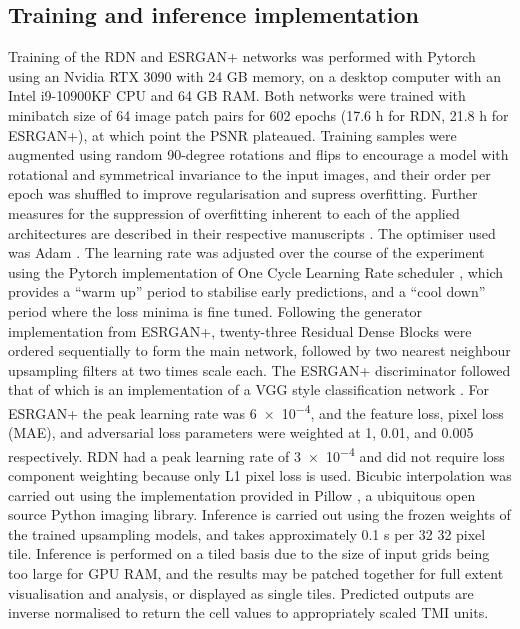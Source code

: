 \documentclass[manuscript.tex]{subfiles}
\begin{document}
\subsection{Training and inference implementation}
Training of the RDN\textdaggerdbl{} and ESRGAN+ networks was performed with Pytorch \parencite{paszkePyTorchImperativeStyle2019} using an Nvidia RTX 3090 with 24 GB memory, on a desktop computer with an Intel i9-10900KF CPU and 64 GB RAM\@.
Both networks were trained with minibatch size of 64 image patch pairs for \num{602} epochs (\num{17.6} h for RDN\textdaggerdbl{}, \num{21.8} h for ESRGAN+), at which point the PSNR plateaued.
Training samples were augmented using random 90-degree rotations and flips to encourage a model with rotational and symmetrical invariance to the input images, and their order per epoch was shuffled to improve regularisation and supress overfitting.
Further measures for the suppression of overfitting inherent to each of the applied architectures are described in their respective manuscripts \parencite{wangESRGANEnhancedSuperresolution2018,zhangResidualDenseNetwork2018}.
The optimiser used was Adam \parencite{kingmaAdamMethodStochastic2015}.
The learning rate was adjusted over the course of the experiment using the Pytorch implementation of One Cycle Learning Rate scheduler \parencite{smithSuperconvergenceVeryFast2018}, which provides a “warm up” period to stabilise early predictions, and a “cool down” period where the loss minima is fine tuned.
Following the generator implementation from ESRGAN+, twenty-three Residual Dense Blocks were ordered sequentially to form the main network, followed by two nearest neighbour upsampling filters at two times scale each.
The ESRGAN+ discriminator followed that of \cite{rakotonirinaESRGANFurtherImproving2020} which is an implementation of a VGG style classification network \parencite{simonyanVeryDeepConvolutional2015}.
For ESRGAN+ the peak learning rate was \num{6e-4}, and the feature loss, pixel loss (MAE), and adversarial loss parameters were weighted at \num{1}, \num{0.01}, and \num{0.005} respectively.
RDN\textdaggerdbl{} had a peak learning rate of \num{3e-4} and did not require loss component weighting because only L1 pixel loss is used.
Bicubic interpolation was carried out using the implementation provided in Pillow \parencite{vankemenadePythonpillowPillow2021}, a ubiquitous open source Python imaging library.
Inference is carried out using the frozen weights of the trained upsampling models, and takes approximately \num{0.1} s per 32 \texttimes{} 32 pixel tile.
Inference is performed on a tiled basis due to the size of input grids being too large for GPU RAM, and the results may be patched together for full extent visualisation and analysis, or displayed as single tiles.
Predicted outputs are inverse normalised to return the cell values to appropriately scaled TMI units.
\end{document}
